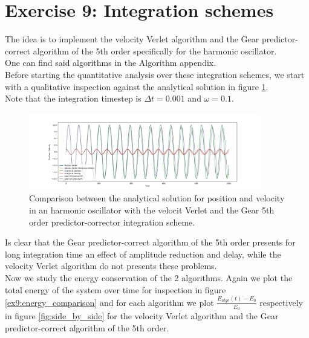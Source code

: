 \chapter*{Exercise 9: Integration schemes}

The idea is to implement the velocity Verlet algorithm and the Gear predictor-correct algorithm of the 5th order specifically for the harmonic oscillator. \\
One can find said algorithms in the Algorithm appendix. \\
Before starting the quantitative analysis over these integration schemes, we start with a qualitative inspection against the analytical solution in figure \ref{ex9:schemes_comparison}. \\
Note that the integration timestep is $\Delta t = 0.001$ and $\omega = 0.1$.

\begin{figure}[H]
    \centering
    \includegraphics[width=0.9\textwidth]{FIG/ex9/integration_schemes_comparison.png}
    \caption{Comparison between the analytical solution for position and velocity in an harmonic oscillator with the velocit Verlet and the Gear 5th order predictor-corrector integration scheme.}
    \label{ex9:schemes_comparison}
\end{figure}

Is clear that the Gear predictor-correct algorithm of the 5th order presents for long integration time an effect of amplitude reduction and delay, while the velocity Verlet algorithm do not presents these problems. \\
Now we study the energy conservation of the 2 algorithms. Again we plot the total energy of the system over time for inspection in figure \ref{ex9:energy_comparison} and for each algorithm we plot $\frac{E_{algo}(t) - E_0}{E_0}$ respectively in figure \ref{fig:side_by_side} for the velocity Verlet algorithm and the Gear predictor-correct algorithm of the 5th order. 

